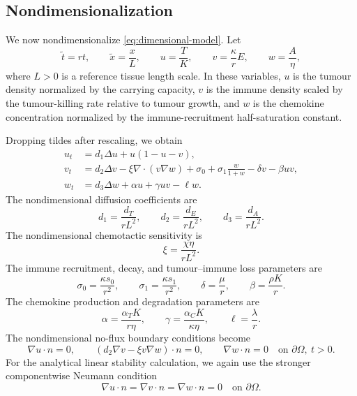 \documentclass[a4paper,fleqn,longmktitle]{cas-sc}
\theoremstyle{plain}
\theoremstyle{definition}
\numberwithin{equation}{section}
\begin{document}
\subsection{Nondimensionalization}
\label{subsec:nondimensionalization}

We now nondimensionalize \eqref{eq:dimensional-model}. Let
\[
\widetilde t=rt,\qquad
\widetilde x=\frac{x}{L},\qquad
u=\frac{T}{K},\qquad
v=\frac{\kappa}{r}E,\qquad
w=\frac{A}{\eta},
\]
where $L>0$ is a reference tissue length scale. In these variables, $u$ is the
tumour density normalized by the carrying capacity, $v$ is the immune density
scaled by the tumour-killing rate relative to tumour growth, and $w$ is the
chemokine concentration normalized by the immune-recruitment half-saturation
constant.

Dropping tildes after rescaling, we obtain
\begin{equation}\label{eq:nondim-model}
\begin{aligned}
u_t &= d_1\Delta u+u(1-u-v),\\
v_t &= d_2\Delta v-\xi\nabla\cdot(v\nabla w)
      +\sigma_0+\sigma_1\frac{w}{1+w}-\delta v-\beta uv,\\
w_t &= d_3\Delta w+\alpha u+\gamma uv-\ell w.
\end{aligned}
\end{equation}
The nondimensional diffusion coefficients are
\[
d_1=\frac{d_T}{rL^2},\qquad
d_2=\frac{d_E}{rL^2},\qquad
d_3=\frac{d_A}{rL^2}.
\]
The nondimensional chemotactic sensitivity is
\[
\xi=\frac{\chi\eta}{rL^2}.
\]
The immune recruitment, decay, and tumour--immune loss parameters are
\[
\sigma_0=\frac{\kappa s_0}{r^2},\qquad
\sigma_1=\frac{\kappa s_1}{r^2},\qquad
\delta=\frac{\mu}{r},\qquad
\beta=\frac{\rho K}{r}.
\]
The chemokine production and degradation parameters are
\[
\alpha=\frac{\alpha_T K}{r\eta},\qquad
\gamma=\frac{\alpha_C K}{\kappa\eta},\qquad
\ell=\frac{\lambda}{r}.
\]
The nondimensional no-flux boundary conditions become
\begin{equation}\label{eq:nondim-noflux}
\nabla u\cdot n=0,\qquad
(d_2\nabla v-\xi v\nabla w)\cdot n=0,\qquad
\nabla w\cdot n=0
\quad\text{on }\partial\Omega,\ t>0 .
\end{equation}
For the analytical linear stability calculation, we again use the stronger
componentwise Neumann condition
\begin{equation}\label{eq:no_flux_pointwise}
\nabla u\cdot n=\nabla v\cdot n=\nabla w\cdot n=0
\quad\text{on }\partial\Omega .
\end{equation}
\end{document}
